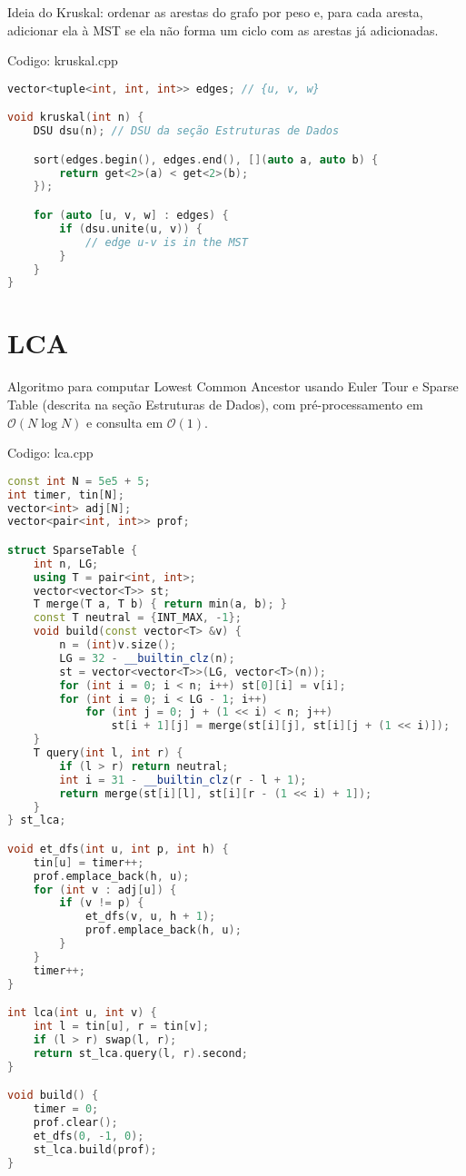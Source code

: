 \documentclass[10pt, a4paper, oneside]{book}
\begin{document}
Ideia do Kruskal: ordenar as arestas do grafo por peso e, para cada aresta, adicionar ela à MST se ela não forma um ciclo com as arestas já adicionadas.
\hfill

Codigo: kruskal.cpp

\begin{lstlisting}[language=C++]
vector<tuple<int, int, int>> edges; // {u, v, w}

void kruskal(int n) {
    DSU dsu(n); // DSU da seção Estruturas de Dados

    sort(edges.begin(), edges.end(), [](auto a, auto b) {
        return get<2>(a) < get<2>(b);
    });

    for (auto [u, v, w] : edges) {
        if (dsu.unite(u, v)) {
            // edge u-v is in the MST
        }
    }
}
\end{lstlisting}
\hfill

\section{LCA}


Algoritmo para computar Lowest Common Ancestor usando Euler Tour e Sparse Table (descrita na seção Estruturas de Dados), com pré-processamento em $\mathcal{O}(N \log N)$ e consulta em $\mathcal{O}(1)$.

\hfill

Codigo: lca.cpp

\begin{lstlisting}[language=C++]
const int N = 5e5 + 5;
int timer, tin[N];
vector<int> adj[N];
vector<pair<int, int>> prof;

struct SparseTable {
    int n, LG;
    using T = pair<int, int>;
    vector<vector<T>> st;
    T merge(T a, T b) { return min(a, b); }
    const T neutral = {INT_MAX, -1};
    void build(const vector<T> &v) {
        n = (int)v.size();
        LG = 32 - __builtin_clz(n);
        st = vector<vector<T>>(LG, vector<T>(n));
        for (int i = 0; i < n; i++) st[0][i] = v[i];
        for (int i = 0; i < LG - 1; i++)
            for (int j = 0; j + (1 << i) < n; j++)
                st[i + 1][j] = merge(st[i][j], st[i][j + (1 << i)]);
    }
    T query(int l, int r) {
        if (l > r) return neutral;
        int i = 31 - __builtin_clz(r - l + 1);
        return merge(st[i][l], st[i][r - (1 << i) + 1]);
    }
} st_lca;

void et_dfs(int u, int p, int h) {
    tin[u] = timer++;
    prof.emplace_back(h, u);
    for (int v : adj[u]) {
        if (v != p) {
            et_dfs(v, u, h + 1);
            prof.emplace_back(h, u);
        }
    }
    timer++;
}

int lca(int u, int v) {
    int l = tin[u], r = tin[v];
    if (l > r) swap(l, r);
    return st_lca.query(l, r).second;
}

void build() {
    timer = 0;
    prof.clear();
    et_dfs(0, -1, 0);
    st_lca.build(prof);
}\end{lstlisting}
\hfill
\end{document}
